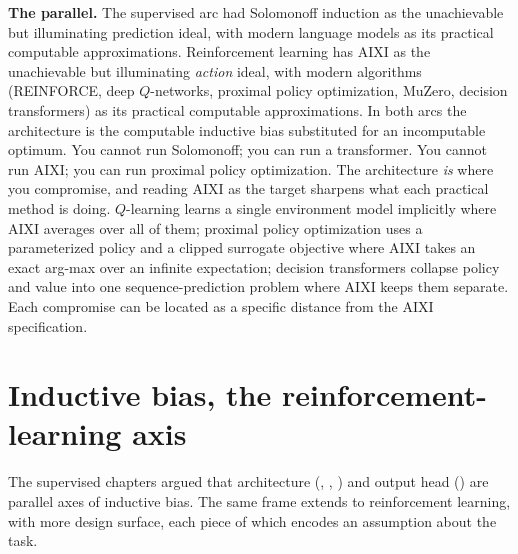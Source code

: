 \textbf{The parallel.} The supervised arc had Solomonoff induction as the
unachievable but illuminating prediction ideal, with modern language models as
its practical computable approximations. Reinforcement learning has AIXI as the
unachievable but illuminating \emph{action} ideal, with modern algorithms
(REINFORCE, deep $Q$-networks, proximal policy optimization, MuZero, decision
transformers) as its practical computable approximations. In both arcs the
architecture is the computable inductive bias substituted for an incomputable
optimum. You cannot run Solomonoff; you can run a transformer. You cannot run
AIXI; you can run proximal policy optimization. The architecture \emph{is}
where you compromise, and reading AIXI as the target sharpens what each
practical method is doing. $Q$-learning learns a single environment model
implicitly where AIXI averages over all of them; proximal policy optimization
uses a parameterized policy and a clipped surrogate objective where AIXI takes
an exact arg-max over an infinite expectation; decision transformers collapse
policy and value into one sequence-prediction problem where AIXI keeps them
separate. Each compromise can be located as a specific distance from the AIXI
specification.

\section{Inductive bias, the reinforcement-learning axis}\label{sec:rl-axis}

The supervised chapters argued that architecture (,
, ) and output head ()
are parallel axes of inductive bias. The same frame extends to reinforcement
learning, with more design surface, each piece of which encodes an assumption
about the task.

